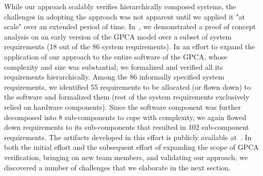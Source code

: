While our approach scalably verifies hierarchically composed systems, the challenges in adopting the approach was not apparent until we applied it "at scale" over an extended period of time. In~\cite{hilt2013}, we demonstrated a proof of concept analysis on an early version of the GPCA model over a subset of system requirements (18 out of the 86 system requirements). In an effort to expand the application of our approach to the entire software of the GPCA, whose complexity and size was substantial, we formalized and verified all its requirements hierarchically. Among the 86 informally specified system requirements, we identified 55 requirements to be allocated (or flown down) to the software and formalized them (rest of the system requirements exclusively relied on hardware components). Since the software component was further decomposed into 8 sub-components to cope with complexity, we again flowed down requirements to its  sub-components that resulted in 102 sub-component requirements. The artifacts developed in this effort is publicly available at~\cite{gpca-artifacts}. In both the initial effort and the subsequent effort of expanding the scope of GPCA verification, bringing on new team members, and validating our approach, we discovered a number of challenges that we elaborate in the next section.


%
%


